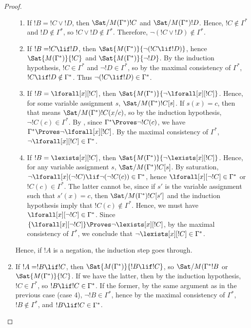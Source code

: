 \documentclass[../../include/open-logic-section]{subfiles}
\begin{document}
\begin{proof}
\begin{enumerate}
\begin{enumerate}
\item {} If $!B = !C \lor !D$, then $\Sat/{M(\Gamma^*)}{!C}$ and $\Sat/{M(\Gamma^*)}{!D}$. Hence, $!C \notin 
\Gamma^*$ and $!D \notin \Gamma^*$, so $!C \lor !D \notin \Gamma^*$. Therefore, $\lnot (!C \lor !D) \notin 
\Gamma^*$.

\item {} If $!B = !C \lif !D$, then $\Sat{M(\Gamma^*)}{\lnot(!C \lif !D)}$, hence $\Sat{M(\Gamma^*)}{!C}$ and 
$\Sat{M(\Gamma^*)}{\lnot !D}$. By the induction hypothesis, $!C \in \Gamma^*$ and $\lnot !D \in 
\Gamma^*$, so by the maximal consistency of $\Gamma^*$, $!C \lif !D \notin \Gamma^*$. Thus $\lnot 
(!C \lif !D) \in \Gamma^*$.

\item {} If $!B=\lforall[x][!C]$, then $\Sat{M(\Gamma^*)}{\lnot \lforall[x][!C]}$. Hence, for some variable 
assignment $s$, $\Sat/{M(\Gamma^*)}{!C}[s]$. If $s(x)=c$, then that means $\Sat/{M(\Gamma^*)}{!C(x/c)}$, 
so by the induction hypothesis, $\lnot !C(c) \in \Gamma^*$. By , since 
$\Gamma^* \Proves \lnot !C (c)$, we have $\Gamma^* \Proves \lnot \lforall[x][!C]$. By the maximal 
consistency of $\Gamma^*$, $\lnot \lforall[x][!C]\in \Gamma^*$. 

\item {} If $!B = \lexists[x][!C]$, then $\Sat{M(\Gamma^*)}{\lnot \lexists[x][!C]}$. Hence, for any variable assignment 
$s$, $\Sat/{M(\Gamma^*)}{!C}[s]$. By saturation, $\lnot \lforall[x](\lnot !C) \lif \lnot (\lnot !C(c)) \in \Gamma^*$, 
hence $\lforall[x][\lnot !C] \in \Gamma^*$ or $!C (c) \in \Gamma^*$. The latter cannot be, since if $s'$ is the 
variable assignment such that $s'(x)=c$, then $\Sat/{M(\Gamma^*)}{!C}[s']$ and the induction hypothesis imply 
that $!C (c) \notin \Gamma^*$. Hence, we must have $\lforall[x][\lnot!C] \in \Gamma^*$. Since $\{ \lforall[x][\lnot !C] \} 
\Proves \lnot \lexists[x][!C]$, by the maximal consistency of $\Gamma^*$, we conclude that $\lnot 
\lexists[x][!C] \in \Gamma^*$. 

\end{enumerate}

 Hence, if $!A$ is a negation, the induction step goes through.

\item {} If $!A = !B \lif !C$, then $\Sat{M(\Gamma^*)}{!B \lif !C}$, so $\Sat/{M(\Gamma^*}{!B}$ or $\Sat{M 
(\Gamma^*)}{!C}$. If we have the latter, then by the induction hypothesis, $!C \in \Gamma^*$, so $!B \lif !C \in 
\Gamma^*$. If the former, by the same argument as in the previous case (case 4), $\lnot !B \in \Gamma^*$, hence 
by the maximal consistency of $\Gamma^*$, $!B \notin \Gamma^*$, and $!B \lif !C \in \Gamma^*$.


\end{enumerate}
\end{proof}
\end{document}
